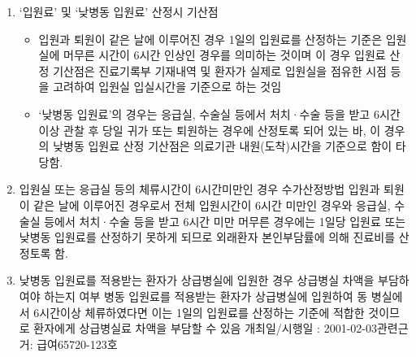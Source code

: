 {\begin{enumerate}\tightlist
\item `입원료' 및 `낮병동 입원료' 산정시 기산점
	\begin{mdframed}[linecolor=blue,middlelinewidth=2]	
	\begin{itemize}\tightlist
	\item 입원과 퇴원이 같은 날에 이루어진 경우 1일의 입원료를 산정하는 기준은 입원실에 머무른 시간이 6시간 인상인 경우를 의미하는 것이며 이 경우 입원료 산정 기산점은 진료기록부 기재내역 및 환자가 실제로 입원실을 점유한 시점 등을 고려하여 입원실 입실시간을 기준으로 하는 것임
	\item `낮병동 입원료'의 경우는 응급실, 수술실 등에서 처치·수술 등을 받고 6시간 이상 관찰 후 당일 귀가 또는 퇴원하는 경우에 산정토록 되어 있는 바, 이 경우의 낮병동 입원료 산정 기산점은 의료기관 내원(도착)시간을 기준으로 함이 타당함.
	\end{itemize}
	\end{mdframed}
\item 입원실 또는 응급실 등의 체류시간이 6시간미만인 경우 수가산정방법 입원과 퇴원이 같은 날에 이루어진 경우로서 전체 입원시간이 6시간 미만인 경우와 응급실, 수술실 등에서 처치·수술 등을 받고 6시간 미만 머무른 경우에는 1일당 입원료 또는 낮병동 입원료를 산정하기 못하게 되므로 외래환자 본인부담률에 의해 진료비를 산정토록 함.
\item 낮병동 입원료를 적용받는 환자가 상급병실에 입원한 경우 상급병실 차액을 부담하여야 하는지 여부
병동 입원료를 적용받는 환자가 상급병실에 입원하여 동 병실에서 6시간이상 체류하였다면 이는 1일의 입원료를 산정하는 기준에 적합한 것이므로 환자에게 상급병실료 차액을 부담할 수 있음
개최일/시행일 : 2001-02-03관련근거: 급여65720-123호
\end{enumerate}

}
